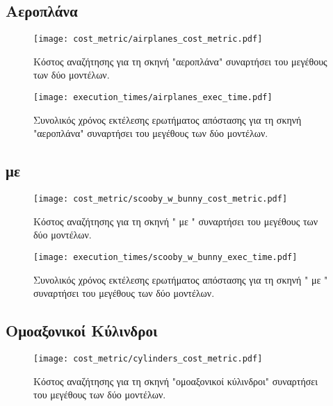 \subsection{Αεροπλάνα}

\begin{figure}[H]
    \centering
    \texttt{[image: cost\_metric/airplanes\_cost\_metric.pdf]}
    \caption[Κόστος Αναζήτησης για "αεροπλάνα"] {
        Κόστος αναζήτησης για τη σκηνή "αεροπλάνα" συναρτήσει 
        του μεγέθους των δύο μοντέλων.
    }
\end{figure}

\begin{figure}[H]
    \centering
    \texttt{[image: execution\_times/airplanes\_exec\_time.pdf]}
    \caption[Συνολικός Χρόνος Εκτέλεσης για "αεροπλάνα"] {
        Συνολικός χρόνος εκτέλεσης ερωτήματος απόστασης 
        για τη σκηνή "αεροπλάνα" συναρτήσει του μεγέθους των δύο μοντέλων.
    }
\end{figure}

\subsection{ με }
\begin{figure}[H]
    \centering
    \texttt{[image: cost\_metric/scooby\_w\_bunny\_cost\_metric.pdf]}
    \caption[Κόστος Αναζήτησης για " με "] {
        Κόστος αναζήτησης για τη σκηνή " με " συναρτήσει 
        του μεγέθους των δύο μοντέλων.
    }
\end{figure}

\begin{figure}[H]
    \centering
    \texttt{[image: execution\_times/scooby\_w\_bunny\_exec\_time.pdf]}
    \caption[Συνολικός Χρόνος Εκτέλεσης για " με "] {
        Συνολικός χρόνος εκτέλεσης ερωτήματος απόστασης 
        για τη σκηνή " με " συναρτήσει του μεγέθους των δύο μοντέλων.
    }
\end{figure}


\subsection{Ομοαξονικοί Κύλινδροι}
\begin{figure}[H]
    \centering
    \texttt{[image: cost\_metric/cylinders\_cost\_metric.pdf]}
    \caption[Κόστος Αναζήτησης για "ομοαξονικοί κύλινδροι"] {
        Κόστος αναζήτησης για τη σκηνή "ομοαξονικοί κύλινδροι" συναρτήσει 
        του μεγέθους των δύο μοντέλων.
    }
\end{figure}

